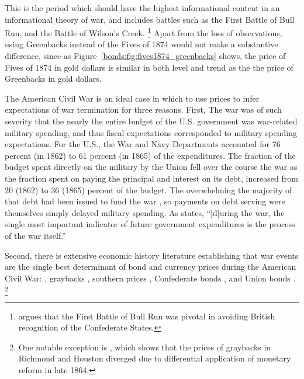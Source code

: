This is the period which should have the highest informational content in an informational theory of war, and includes battles such as the First Battle of Bull Run, and the Battle of Wilson's Creek.%
\footnote{\textcite{Poast2012} argues that the First Battle of Bull Run was pivotal in avoiding British recognition of the Confederate States.}
Apart from the loss of observations, using Greenbacks instead of the Fives of 1874 would not make a substantive difference, since as Figure~\ref{bonds:fig:fives1874_greenbacks} shows, the price of Fives of 1874 in gold dollars is similar in both level and trend as the the price of Greenbacks in gold dollars.

The American Civil War is an ideal case in which to use prices to infer expectations of war termination for three reasons.
First, The war was of such severity that the nearly the entire budget of the U.S. government was war-related military spending, and thus fiscal expectations corresponded to military spending expectations. %
For the U.S., the War and Navy Departments accounted for 76 percent (in 1862) to 61 percent (in 1865) of the expenditures.
The fraction of the budget spent directly on the military by the Union fell over the course the war as the fraction spent on paying the principal and interest on its debt, increased from 20 (1862) to 36 (1865) percent of the budget.
The overwhelming the majority of that debt had been issued to fund the war \parencites{Treasury1861a}{Treasury1861b}{Treasury1862}{Treasury1863}{Treasury1864}{Treasury1865}, so payments on debt serving were themselves simply delayed military spending.
As \textcite[][668]{McCandless1996} states, ``[d]uring the war, the single most important indicator of future government expenditures is the process of the war itself.''

Second, there is extensive economic history literature establishing that war events are the single best determinant of bond and currency prices during the American Civil War:
\parencites{Mitchell1903}{Mitchell1908}{Calomiris1988}{WillardGuinnaneEtAl1996}{McCandless1996}{SmithSmith1997}, graybacks \parencites{Schwab1901}{Weidenmier2002}, southern prices
\parencite{BurdekinLangdana1993}, Confederate bonds \parencites{DavisPecquet1990}{BrownBurdekin2000}{OosterlinckWeidenmier2007}, and Union bonds \parencite{Roll1972}.%
\footnote{One notable exception is \textcite{BurdekinWeidenmier2001}, which shows that the prices of graybacks in Richmond and Houston diverged due to differential application of monetary reform in late 1864.}

